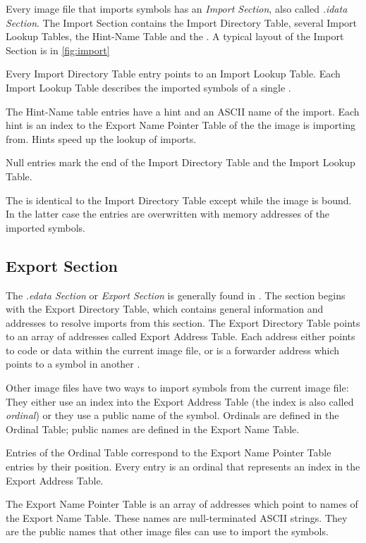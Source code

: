 Every image file that imports symbols has an \emph{Import Section}, also called \emph{.idata Section}.
The Import Section contains the Import Directory Table, several Import Lookup Tables, the Hint-Name Table and the \IAT{}. A typical layout of the Import Section is in \autoref{fig:import}

Every Import Directory Table entry points to an Import Lookup Table. Each Import Lookup Table describes the imported symbols of a single \DLL{}.

The Hint-Name table entries have a hint and an ASCII name of the import. Each hint is an index to the Export Name Pointer Table of the \DLL{} the image is importing from. Hints speed up the lookup of imports.

Null entries mark the end of the Import Directory Table and the Import Lookup Table.

The \IAT{} is identical to the Import Directory Table except while the image is bound. In the latter case the \IAT{} entries are overwritten with memory addresses of the imported symbols.

\subsection*{Export Section}

The \emph{.edata Section} or \emph{Export Section} is generally found in . The section begins with the Export Directory Table, which contains general information and addresses to resolve imports from this section. The Export Directory Table points to an array of addresses called Export Address Table. Each address either points to code or data within the current image file, or is a forwarder address which points to a symbol in another \DLL{}. 

Other image files have two ways to import symbols from the current image file: They either use an index into the Export Address Table (the index is also called \emph{ordinal}) or they use a public name of the symbol. Ordinals are defined in the Ordinal Table; public names are defined in the Export Name Table.

Entries of the Ordinal Table correspond to the Export Name Pointer Table entries by their position. Every entry is an ordinal that represents an index in the Export Address Table.

The Export Name Pointer Table is an array of addresses which point to names of the Export Name Table. These names are null-terminated ASCII strings. They are the public names that other image files can use to import the symbols.

